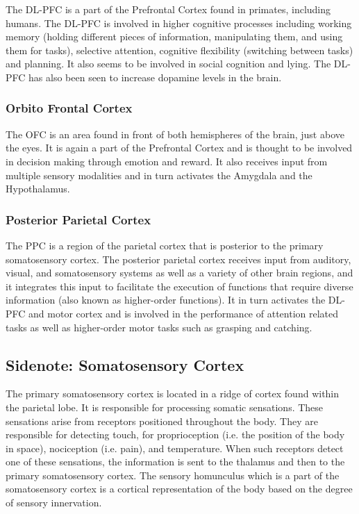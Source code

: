 \documentclass[a4paper, amsfonts, amssymb, amsmath, reprint, showkeys, nofootinbib, twoside]{revtex4-1}
\begin{document}
The DL-PFC is a part of the Prefrontal Cortex found in primates, including
humans. The DL-PFC is involved in higher cognitive processes including working memory
(holding different pieces of information, manipulating them, and using them for
tasks), selective attention, cognitive flexibility (switching between tasks) and
planning. It also seems to be involved in social cognition and lying. The DL-PFC has
also been seen to increase dopamine levels in the brain. \cite{dlpfcmemory,dlpfctasks,dlpfclying}

\subsubsection{Orbito Frontal Cortex}

The OFC is an area found in front of both hemispheres of the brain, just above the
eyes. It is again a part of the Prefrontal Cortex and is thought to be involved in
decision making through emotion and reward. It also receives input from multiple
sensory modalities and in turn activates the Amygdala and the
Hypothalamus. \cite{theprefrontalcortex,ofcprimates,theorbitofrontalcortex}

\subsubsection{Posterior Parietal Cortex}
The PPC is a region of the parietal cortex that is posterior to the primary somatosensory 
cortex.
The posterior parietal cortex receives input from auditory, visual, and somatosensory systems
as well as a variety of other brain regions, and it integrates this input to facilitate 
the execution of functions that require diverse information (also known as higher-order functions). 
It in turn activates the DL-PFC and motor cortex and is involved in the performance of 
attention related tasks as well as higher-order motor tasks such as grasping and catching. \cite{parietallobesa,parietallobes}

\subsection {Sidenote: Somatosensory Cortex}
The primary somatosensory cortex is located in a ridge of cortex found within the parietal lobe.
It is responsible for processing somatic sensations. These sensations arise from receptors 
positioned throughout the body. They are responsible for detecting touch, for proprioception 
(i.e. the position of the body in space), nociception (i.e. pain), and temperature. \cite{somato}
When such receptors detect one of these sensations,  the information is sent to the thalamus and 
then to the primary somatosensory cortex.
The sensory homunculus which is a part of the somatosensory cortex is a cortical representation
of the body based on the degree of sensory innervation. \cite{sensoryhom}
\end{document}
